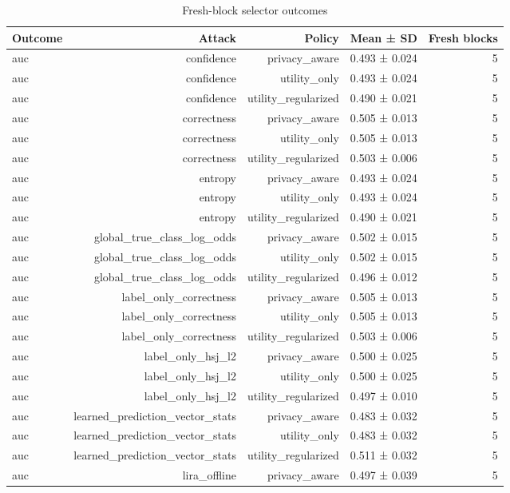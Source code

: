 \begin{table}
\caption{Fresh-block selector outcomes}
\label{tab:satml_selector_summary}
\begin{tabular}{lrrrr}
\toprule
Outcome & Attack & Policy & Mean ± SD & Fresh blocks \\
\midrule
auc & confidence & privacy\_aware & 0.493 ± 0.024 & 5 \\
auc & confidence & utility\_only & 0.493 ± 0.024 & 5 \\
auc & confidence & utility\_regularized & 0.490 ± 0.021 & 5 \\
auc & correctness & privacy\_aware & 0.505 ± 0.013 & 5 \\
auc & correctness & utility\_only & 0.505 ± 0.013 & 5 \\
auc & correctness & utility\_regularized & 0.503 ± 0.006 & 5 \\
auc & entropy & privacy\_aware & 0.493 ± 0.024 & 5 \\
auc & entropy & utility\_only & 0.493 ± 0.024 & 5 \\
auc & entropy & utility\_regularized & 0.490 ± 0.021 & 5 \\
auc & global\_true\_class\_log\_odds & privacy\_aware & 0.502 ± 0.015 & 5 \\
auc & global\_true\_class\_log\_odds & utility\_only & 0.502 ± 0.015 & 5 \\
auc & global\_true\_class\_log\_odds & utility\_regularized & 0.496 ± 0.012 & 5 \\
auc & label\_only\_correctness & privacy\_aware & 0.505 ± 0.013 & 5 \\
auc & label\_only\_correctness & utility\_only & 0.505 ± 0.013 & 5 \\
auc & label\_only\_correctness & utility\_regularized & 0.503 ± 0.006 & 5 \\
auc & label\_only\_hsj\_l2 & privacy\_aware & 0.500 ± 0.025 & 5 \\
auc & label\_only\_hsj\_l2 & utility\_only & 0.500 ± 0.025 & 5 \\
auc & label\_only\_hsj\_l2 & utility\_regularized & 0.497 ± 0.010 & 5 \\
auc & learned\_prediction\_vector\_stats & privacy\_aware & 0.483 ± 0.032 & 5 \\
auc & learned\_prediction\_vector\_stats & utility\_only & 0.483 ± 0.032 & 5 \\
auc & learned\_prediction\_vector\_stats & utility\_regularized & 0.511 ± 0.032 & 5 \\
auc & lira\_offline & privacy\_aware & 0.497 ± 0.039 & 5 \\

\end{tabular}
\end{table}
